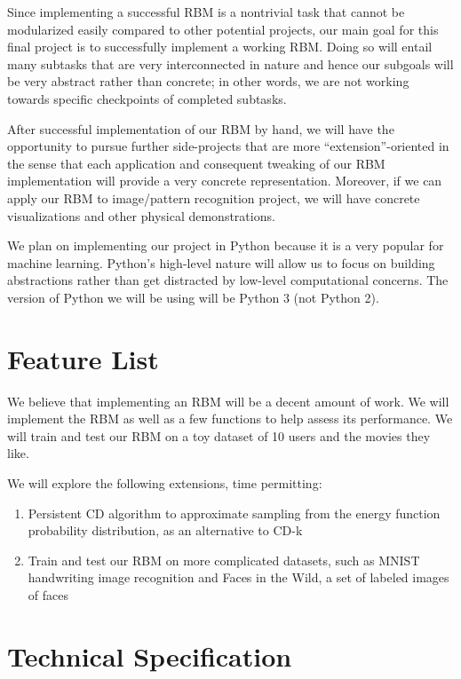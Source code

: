 Since implementing a successful RBM is a nontrivial task that cannot be modularized easily compared to other potential projects, our main goal for this final project is to successfully implement a working RBM. Doing so will entail many subtasks that are very interconnected in nature and hence our subgoals will be very abstract rather than concrete; in other words, we are not working towards specific checkpoints of completed subtasks. 

After successful implementation of our RBM by hand, we will have the opportunity to pursue further side-projects that are more ``extension''-oriented in the sense that each application and consequent tweaking of our RBM implementation will provide a very concrete representation. Moreover, if we can apply our RBM to image/pattern recognition project, we will have concrete visualizations and other physical demonstrations. 

We plan on implementing our project in Python because it is a very popular for machine learning. Python's high-level nature will allow us to focus on building abstractions rather than get distracted by low-level computational concerns. The version of Python we will be using will be Python 3 (not Python 2).

\section{Feature List}

We believe that implementing an RBM will be a decent amount of work. We will implement the RBM as well as a few functions to help assess its performance. We will train and test our RBM on a toy dataset of 10 users and the movies they like. 

We will explore the following extensions, time permitting:
\begin{enumerate}
  \item Persistent CD algorithm to approximate sampling from the energy function probability distribution, as an alternative to CD-k
  \item Train and test our RBM on more complicated datasets, such as MNIST handwriting image recognition and Faces in the Wild, a set of labeled images of faces
\end{enumerate}

\section{Technical Specification}

